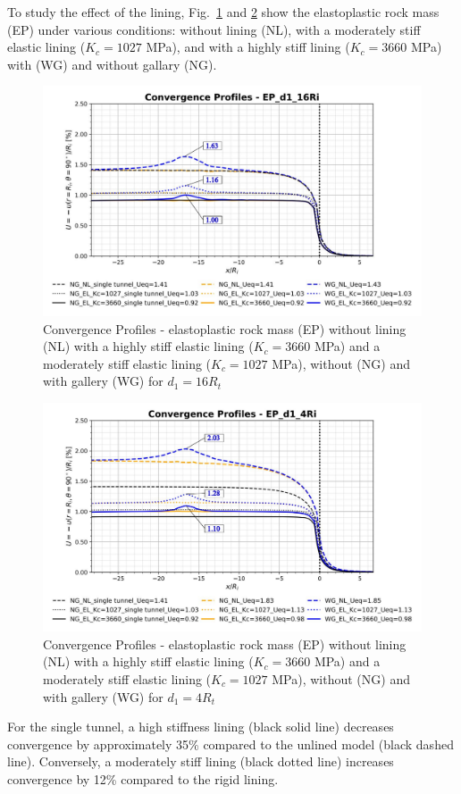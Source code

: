 \documentclass[a4paper,fleqn]{cas-sc}
\begin{document}
To study the effect of the lining, Fig.~\ref{EP_d1_16Ri} and \ref{EP_d1_4Ri} show the elastoplastic rock mass (EP) under various conditions: without lining (NL), with a moderately stiff elastic lining ($K_c = 1027$ MPa), and with a highly stiff lining ($K_c = 3660$ MPa) with (WG) and without gallary (NG).
\begin{figure}[h!]
	\centering
	\includegraphics[scale=0.5]{Convergence Profiles - EP_d1_16Ri.pdf}
	\caption{Convergence Profiles - elastoplastic rock mass (EP) without lining (NL) with a highly stiff elastic lining ($K_c = 3660$ MPa) and a moderately stiff elastic lining ($K_c = 1027$ MPa), without (NG) and with gallery (WG) for $d_1 = 16R_t$}
	\label{EP_d1_16Ri}
\end{figure}
\FloatBarrier
\begin{figure}[h!]
	\centering
	\includegraphics[scale=0.5]{Convergence Profiles - EP_d1_4Ri.pdf}
	\caption{Convergence Profiles - elastoplastic rock mass (EP) without lining (NL) with a highly stiff elastic lining ($K_c = 3660$ MPa) and a moderately stiff elastic lining ($K_c = 1027$ MPa), without (NG) and with gallery (WG) for $d_1 = 4R_t$}
	\label{EP_d1_4Ri}
\end{figure}
\FloatBarrier
For the single tunnel, a high stiffness lining (black solid line) decreases convergence by approximately 35\% compared to the unlined model (black dashed line). Conversely, a moderately stiff lining (black dotted line) increases convergence by 12\% compared to the rigid lining. 
\end{document}
